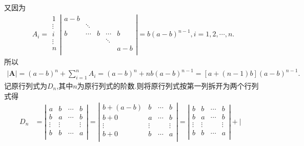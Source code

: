 \documentclass[../../main.tex]{subfiles}
\begin{document}
\begin{solution}
又因为
\begin{align*}
A_i=\begin{array}{l}
1\\
\vdots\\
i\\
\vdots\\
n\\
\end{array}\left| \begin{matrix}
a-b&		&		&		&		\\
&		\ddots&		&		&		\\
b&		\cdots&		b&		\cdots&		b\\
&		&		&		\ddots&		\\
&		&		&		&		a-b\\
\end{matrix} \right|=b\left( a-b \right) ^{n-1},i=1,2,\cdots ,n. 
\end{align*}
所以
\begin{align*}
|\boldsymbol{A}|=\left( a-b \right) ^n+\sum_{i=1}^n{A_i}=\left( a-b \right) ^n+nb\left( a-b \right) ^{n-1}=\left[ a+\left( n-1 \right) b \right] \left( a-b \right) ^{n-1}.
\end{align*}
{\color{blue}}
记原行列式为$D_n$,其中$n$为原行列式的阶数.则将原行列式按第一列拆开为两个行列式得
\begin{align*}
D_n&=\left| \begin{matrix}
a&		b&		\cdots&		b\\
b&		a&		\cdots&		b\\
\vdots&		\vdots&		&		\vdots\\
b&		b&		\cdots&		a\\
\end{matrix} \right|=\left| \begin{matrix}
b+\left( a-b \right)&		b&		\cdots&		b\\
b+0&		a&		\cdots&		b\\
\vdots&		\vdots&		&		\vdots\\
b+0&		b&		\cdots&		a\\
\end{matrix} \right|=\left| \begin{matrix}
b&		b&		\cdots&		b\\
b&		a&		\cdots&		b\\
\vdots&		\vdots&		&		\vdots\\
b&		b&		\cdots&		a\\
\end{matrix} \right|+\left| \begin{matrix}

\end{matrix}
\end{align*}
\end{solution}
\end{document}

